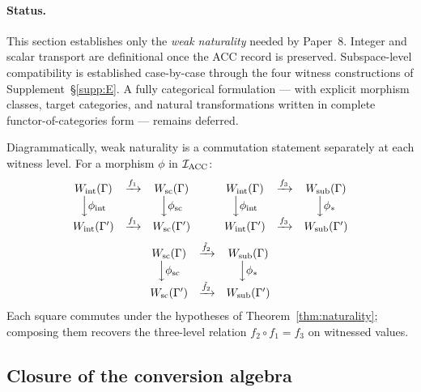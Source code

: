 \documentclass[11pt]{article}
\theoremstyle{plain}
\theoremstyle{definition}
\theoremstyle{remark}
\begin{document}
\paragraph{Status.}
This section establishes only the \emph{weak naturality} needed by Paper~8.  Integer and scalar transport are definitional once the ACC record is preserved.  Subspace-level compatibility is established case-by-case through the four witness constructions of Supplement~\S\ref{supp:E}.  A fully categorical formulation --- with explicit morphism classes, target categories, and natural transformations written in complete functor-of-categories form --- remains deferred.

\medskip

\noindent Diagrammatically, weak naturality is a commutation statement separately at each witness level.  For a morphism $\phi$ in $\mathcal{I}_{\rm ACC}$:
\[
\begin{array}{ccc}
  W_{\rm int}(\Gamma) & \xrightarrow{f_1} & W_{\rm sc}(\Gamma) \\
  \Big\downarrow \phi_{\rm int} & & \Big\downarrow \phi_{\rm sc} \\
  W_{\rm int}(\Gamma') & \xrightarrow{f_1} & W_{\rm sc}(\Gamma')
\end{array}
\qquad
\begin{array}{ccc}
  W_{\rm int}(\Gamma) & \xrightarrow{f_3} & W_{\rm sub}(\Gamma) \\
  \Big\downarrow \phi_{\rm int} & & \Big\downarrow \phi_* \\
  W_{\rm int}(\Gamma') & \xrightarrow{f_3} & W_{\rm sub}(\Gamma')
\end{array}
\]
\[
\begin{array}{ccc}
  W_{\rm sc}(\Gamma) & \xrightarrow{\tilde{f}_2} & W_{\rm sub}(\Gamma) \\
  \Big\downarrow \phi_{\rm sc} & & \Big\downarrow \phi_* \\
  W_{\rm sc}(\Gamma') & \xrightarrow{\tilde{f}_2} & W_{\rm sub}(\Gamma')
\end{array}
\]
Each square commutes under the hypotheses of Theorem~\ref{thm:naturality}; composing them recovers the three-level relation $f_2 \circ f_1 = f_3$ on witnessed values.

\bigskip

\subsection{Closure of the conversion algebra}\label{supp:F2}
\end{document}
